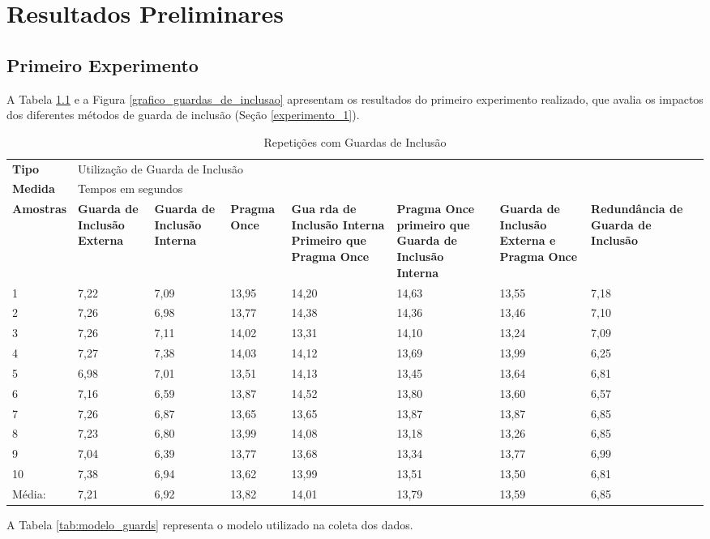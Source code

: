 \chapter[Resultados Preliminares]{Resultados Preliminares}

\section{Primeiro Experimento}

A Tabela \ref{tab:tabela_guarda_de_inclusao} e a Figura 
\ref{grafico_guardas_de_inclusao} apresentam os resultados
 do primeiro experimento realizado, que avalia os impactos
 dos diferentes métodos de guarda de inclusão (Seção \ref{experimento_1}).


\begin{table}[!ht]
\centering
\caption{Repetições com Guardas de Inclusão}
\label{tab:tabela_guarda_de_inclusao}
\begin{tiny}
\begin{tabular}{lp{1.5cm}p{1.5cm}p{1.5cm}p{1.5cm}p{2cm}p{2cm}p{2cm}p{2cm}|}
\toprule
\textbf{Tipo} & \multicolumn{7}{l}{Utilização de Guarda de Inclusão} \\
\textbf{Medida} & \multicolumn{7}{l}{Tempos em segundos } \\
\textbf{Amostras} & \textbf{Guarda de Inclusão Externa} & \textbf{Guarda de Inclusão Interna} & \textbf{Pragma Once} & \textbf{Gua  rda de Inclusão Interna Primeiro que Pragma Once} & \textbf{Pragma Once primeiro que Guarda de Inclusão Interna} & \textbf{Guarda   de Inclusão Externa e Pragma Once} & \textbf{Redundância de Guarda de Inclusão} \\ \midrule
 1  & 7,22 & 7,09 & 13,95  &  14,20 &14,63   &  13,55 &  7,18  \\ \midrule
 2  & 7,26 & 6,98 & 13,77  &  14,38 & 14,36  &  13,46 & 7,10   \\ \midrule
 3  & 7,26 & 7,11 & 14,02  &  13,31 & 14,10  &  13,24 &7,09    \\ \midrule
 4  & 7,27 & 7,38 & 14,03  &  14,12 & 13,69  &  13,99 &6,25    \\ \midrule
 5  & 6,98 & 7,01 & 13,51  &  14,13 & 13,45  &  13,64 &6,81    \\ \midrule
 6  & 7,16 & 6,59 & 13,87  &  14,52 & 13,80  &  13,60 &6,57    \\ \midrule
 7  & 7,26 & 6,87 & 13,65  &  13,65 & 13,87  &  13,87 &6,85    \\ \midrule
 8  & 7,23 & 6,80 & 13,99  &  14,08 & 13,18  &  13,26 &6,85    \\ \midrule
 9  & 7,04 & 6,39 & 13,77  &  13,68 & 13,34  &  13,77 &6,99    \\ \midrule
 10 & 7,38 & 6,94 & 13,62  &  13,99 & 13,51  &  13,50 &6,81    \\ \midrule
 Média: & 7,21 & 6,92 & 13,82& 14,01& 13,79  &  13,59 &6,85    \\ \bottomrule
\end{tabular}
\end{tiny}
\end{table}
A Tabela \ref{tab:modelo_guards} representa o modelo utilizado na coleta dos dados.

